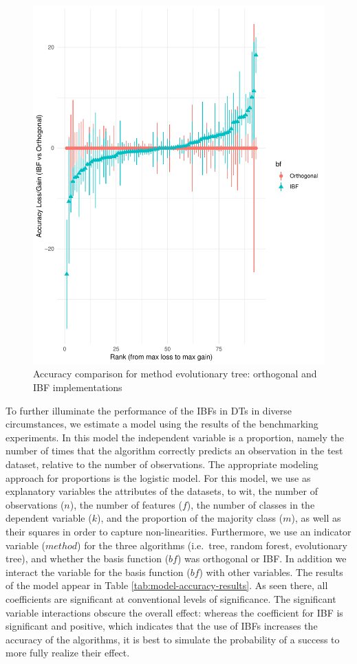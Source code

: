\documentclass[]{elsarticle} %
\makeatletter
\def\maxwidth{\ifdim\Gin@nat@width>\linewidth\linewidth
\else\Gin@nat@width\fi}
\let\Oldincludegraphics\includegraphics
\renewcommand{\includegraphics}[1]{\Oldincludegraphics[width=\maxwidth]{#1}}
\makeatother
\begin{document}
\begin{figure}
\centering
\includegraphics{Trees_with_Base_Functions_v2_files/figure-latex/fig11-accuracy-ev-1.pdf}
\caption{\label{fig:fig11-accuracy-ev}Accuracy comparison for method
evolutionary tree: orthogonal and IBF implementations}
\end{figure}

To further illuminate the performance of the IBFs in DTs in diverse
circumstances, we estimate a model using the results of the benchmarking
experiments. In this model the independent variable is a proportion,
namely the number of times that the algorithm correctly predicts an
observation in the test dataset, relative to the number of observations.
The appropriate modeling approach for proportions is the logistic model.
For this model, we use as explanatory variables the attributes of the
datasets, to wit, the number of observations (\(n\)), the number of
features (\(f\)), the number of classes in the dependent variable
(\(k\)), and the proportion of the majority class (\(m\)), as well as
their squares in order to capture non-linearities. Furthermore, we use
an indicator variable (\(method\)) for the three algorithms (i.e.~tree,
random forest, evolutionary tree), and whether the basis function
(\(bf\)) was orthogonal or IBF. In addition we interact the variable for
the basis function (\(bf\)) with other variables. The results of the
model appear in Table \ref{tab:model-accuracy-results}. As seen there,
all coefficients are significant at conventional levels of significance.
The significant variable interactions obscure the overall effect:
whereas the coefficient for IBF is significant and positive, which
indicates that the use of IBFs increases the accuracy of the algorithms,
it is best to simulate the probability of a success to more fully
realize their effect.
\end{document}
